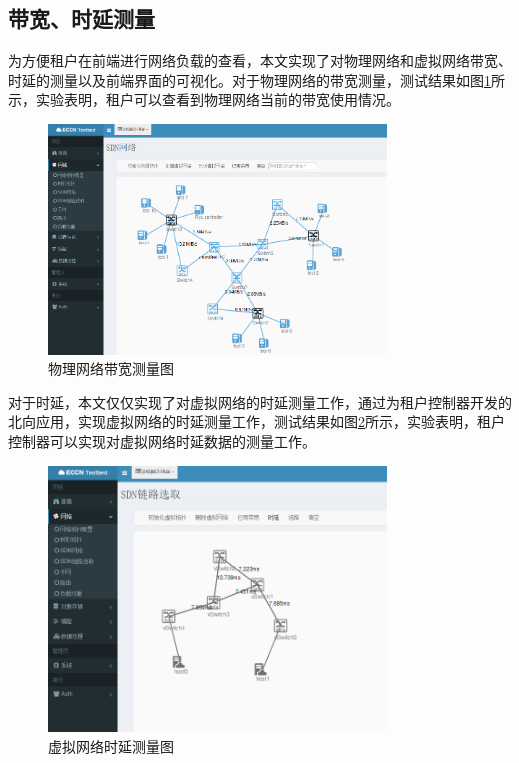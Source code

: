 \subsection{带宽、时延测量}
为方便租户在前端进行网络负载的查看，本文实现了对物理网络和虚拟网络带宽、时延的测量以及前端界面的可视化。对于物理网络的带宽测量，测试结果如图\ref{fig:bandwidth}所示，实验表明，租户可以查看到物理网络当前的带宽使用情况。

\begin{figure}[!htb]
  \centering
  \includegraphics[width=0.8\textwidth,height=0.50\textwidth]{logo/bandwidth.png}
  \caption{物理网络带宽测量图}
  \label{fig:bandwidth}
\end{figure}

对于时延，本文仅仅实现了对虚拟网络的时延测量工作，通过为租户控制器开发的北向应用，实现虚拟网络的时延测量工作，测试结果如图\ref{fig:virtualdelay}所示，实验表明，租户控制器可以实现对虚拟网络时延数据的测量工作。

\begin{figure}[!htb]
  \centering
  \includegraphics[width=0.8\textwidth,height=0.50\textwidth]{logo/virtualdelay.png}
  \caption{虚拟网络时延测量图}
  \label{fig:virtualdelay}
\end{figure}
